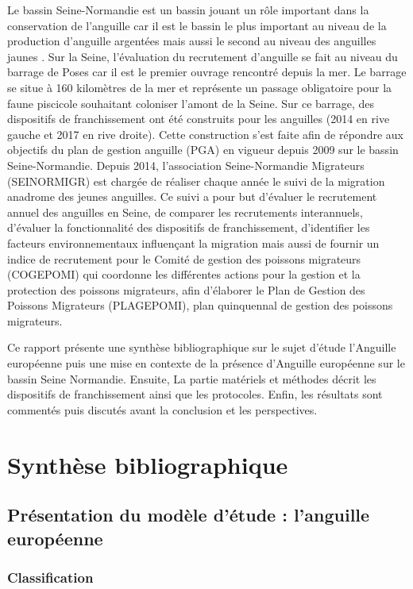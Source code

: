 \documentclass[11pt,titlepage,twoside]{article}\usepackage[]{graphicx}\usepackage[table]{xcolor}
\begin{document}
Le bassin Seine-Normandie est un bassin jouant un rôle important dans la conservation de l’anguille car il est le bassin le plus important au niveau de la production d’anguille argentées mais aussi le second au niveau des anguilles jaunes  \citep{jouanin_eel_2012}.
Sur la Seine, l’évaluation du recrutement d’anguille se fait au niveau du barrage de Poses car il est le premier ouvrage rencontré depuis la mer. Le barrage se situe à 160 kilomètres de la mer et représente un passage obligatoire pour la faune piscicole souhaitant coloniser l’amont de la Seine.
Sur ce barrage, des dispositifs de franchissement ont été construits pour les anguilles (2014 en rive gauche et 2017 en rive droite). Cette construction s’est faite afin de répondre aux objectifs du plan de gestion anguille (PGA) en vigueur depuis 2009 sur le bassin Seine-Normandie.
Depuis 2014, l’association Seine-Normandie Migrateurs (SEINORMIGR) est chargée de réaliser chaque année le suivi de la migration anadrome des jeunes anguilles. Ce suivi a pour but d’évaluer le recrutement annuel des anguilles en Seine, de comparer les recrutements interannuels, d’évaluer la fonctionnalité des dispositifs de franchissement, d’identifier les facteurs environnementaux influençant la migration mais aussi de fournir un indice de recrutement pour le Comité de gestion des poissons migrateurs (COGEPOMI) qui coordonne les différentes actions pour la gestion et la protection des poissons migrateurs, afin d’élaborer le Plan de Gestion des Poissons Migrateurs (PLAGEPOMI), plan quinquennal de gestion des poissons migrateurs.

Ce rapport présente une synthèse bibliographique sur le sujet d’étude \og l’Anguille européenne \fg{} puis une mise en contexte de la présence d’Anguille européenne sur le bassin Seine Normandie. Ensuite, La partie \og matériels et méthodes \fg{} décrit les dispositifs de franchissement ainsi que les protocoles. Enfin, les résultats sont commentés puis discutés avant la conclusion et les perspectives.

\section{Synthèse bibliographique}

\subsection{Présentation du modèle d’étude : l’anguille européenne}

\subsubsection{Classification}
\end{document}
